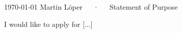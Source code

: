 \documentclass[11pt, a4paper]{awesome-cv}
\begin{document}
\makecvheader[R]

\makecvfooter
  {\today}
  {Martin Löper~~~·~~~Statement of Purpose}
  {}

\makelettertitle

\begin{cvletter}

I would like to apply for [...]

\end{cvletter}


\end{document}

